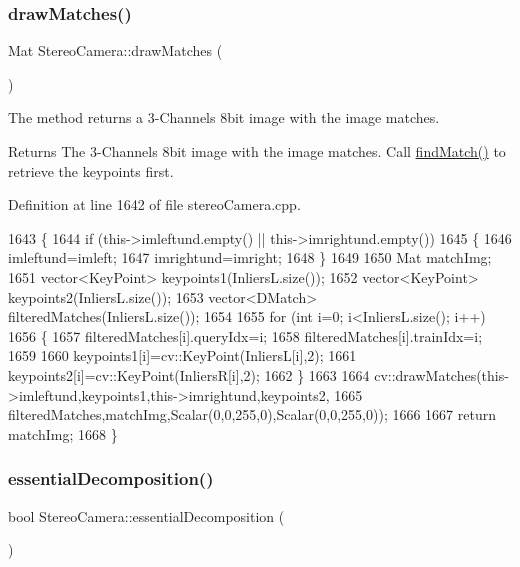 \subsubsection{\texorpdfstring{draw\+Matches()}{drawMatches()}}
{\footnotesize\ttfamily Mat Stereo\+Camera\+::draw\+Matches (\begin{DoxyParamCaption}{ }\end{DoxyParamCaption})}



The method returns a 3-\/\+Channels 8bit image with the image matches. 

\begin{DoxyReturn}{Returns}
The 3-\/\+Channels 8bit image with the image matches. Call \hyperlink{classStereoCamera_aeb1cf4e41058cd70c7df6b8c2511548d}{find\+Match()} to retrieve the keypoints first. 
\end{DoxyReturn}


Definition at line 1642 of file stereo\+Camera.\+cpp.


\begin{DoxyCode}
1643 \{
1644     \textcolor{keywordflow}{if} (this->imleftund.empty() || this->imrightund.empty())
1645     \{
1646         imleftund=imleft;
1647         imrightund=imright;
1648     \}
1649 
1650     Mat matchImg;
1651     vector<KeyPoint> keypoints1(InliersL.size());
1652     vector<KeyPoint> keypoints2(InliersL.size());
1653     vector<DMatch> filteredMatches(InliersL.size());
1654 
1655     \textcolor{keywordflow}{for} (\textcolor{keywordtype}{int} i=0; i<InliersL.size(); i++)
1656     \{
1657         filteredMatches[i].queryIdx=i;
1658         filteredMatches[i].trainIdx=i;
1659 
1660         keypoints1[i]=cv::KeyPoint(InliersL[i],2);
1661         keypoints2[i]=cv::KeyPoint(InliersR[i],2);
1662     \}
1663 
1664     cv::drawMatches(this->imleftund,keypoints1,this->imrightund,keypoints2,
1665             filteredMatches,matchImg,Scalar(0,0,255,0),Scalar(0,0,255,0));
1666 
1667     \textcolor{keywordflow}{return} matchImg;
1668 \}
\end{DoxyCode}
\mbox{\label{classStereoCamera_a180388e93b654802c7c56c18d206214b}} 
\subsubsection{\texorpdfstring{essential\+Decomposition()}{essentialDecomposition()}}
{\footnotesize\ttfamily bool Stereo\+Camera\+::essential\+Decomposition (\begin{DoxyParamCaption}{ }\end{DoxyParamCaption})}



